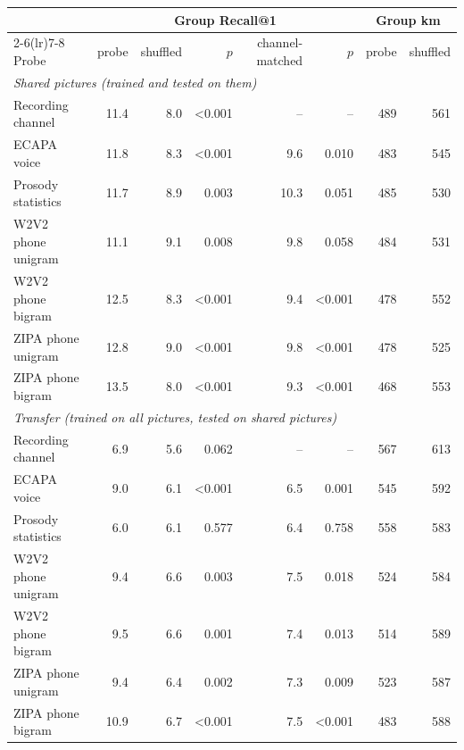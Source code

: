\begin{tabular}{lrrrrrrr}
\toprule
 & \multicolumn{5}{c}{Group Recall@1} & \multicolumn{2}{c}{Group km} \\
\cmidrule(lr){2-6}\cmidrule(lr){7-8}
Probe & probe & shuffled & $p$ & channel-matched & $p$ & probe & shuffled \\
\midrule
\multicolumn{8}{l}{\textit{Shared pictures (trained and tested on them)}} \\
\quad Recording channel & 11.4 & 8.0 & <0.001 & -- & -- & 489 & 561 \\
\quad ECAPA voice & 11.8 & 8.3 & <0.001 & 9.6 & 0.010 & 483 & 545 \\
\quad Prosody statistics & 11.7 & 8.9 & 0.003 & 10.3 & 0.051 & 485 & 530 \\
\quad W2V2 phone unigram & 11.1 & 9.1 & 0.008 & 9.8 & 0.058 & 484 & 531 \\
\quad W2V2 phone bigram & 12.5 & 8.3 & <0.001 & 9.4 & <0.001 & 478 & 552 \\
\quad ZIPA phone unigram & 12.8 & 9.0 & <0.001 & 9.8 & <0.001 & 478 & 525 \\
\quad ZIPA phone bigram & 13.5 & 8.0 & <0.001 & 9.3 & <0.001 & 468 & 553 \\
\midrule
\multicolumn{8}{l}{\textit{Transfer (trained on all pictures, tested on shared pictures)}} \\
\quad Recording channel & 6.9 & 5.6 & 0.062 & -- & -- & 567 & 613 \\
\quad ECAPA voice & 9.0 & 6.1 & <0.001 & 6.5 & 0.001 & 545 & 592 \\
\quad Prosody statistics & 6.0 & 6.1 & 0.577 & 6.4 & 0.758 & 558 & 583 \\
\quad W2V2 phone unigram & 9.4 & 6.6 & 0.003 & 7.5 & 0.018 & 524 & 584 \\
\quad W2V2 phone bigram & 9.5 & 6.6 & 0.001 & 7.4 & 0.013 & 514 & 589 \\
\quad ZIPA phone unigram & 9.4 & 6.4 & 0.002 & 7.3 & 0.009 & 523 & 587 \\
\quad ZIPA phone bigram & 10.9 & 6.7 & <0.001 & 7.5 & <0.001 & 483 & 588 \\
\bottomrule
\end{tabular}
